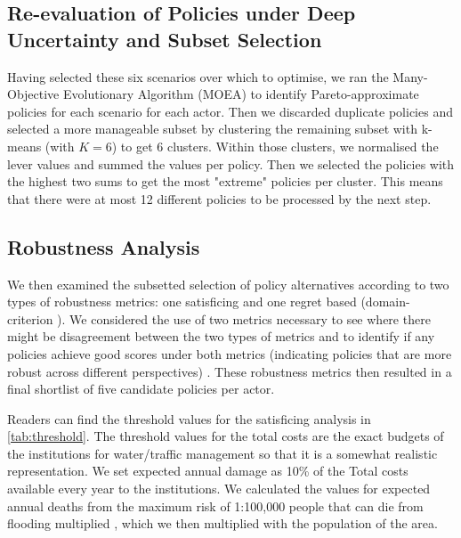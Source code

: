 \subsection{Re-evaluation of Policies under Deep Uncertainty and Subset Selection}
Having selected these six scenarios over which to optimise, we ran the Many-Objective Evolutionary Algorithm (MOEA) to identify Pareto-approximate policies for each scenario for each actor. Then we discarded duplicate policies and selected a more manageable subset by clustering the remaining subset with k-means (with $K=6$) to get 6 clusters. Within those clusters, we normalised the lever values and summed the values per policy. Then we selected the policies with the highest two sums to get the most "extreme" policies per cluster. This means that there were at most 12 different policies to be processed by the next step.

\subsection{Robustness Analysis}
We then examined the subsetted selection of policy alternatives according to two types of robustness metrics: one satisficing and one regret based (domain-criterion \parencite{bartholomew_considering_2020}). We considered the use of two metrics necessary to see where there might be disagreement between the two types of metrics and to identify if any policies achieve good scores under both metrics (indicating policies that are more robust across different perspectives) \parencite{mcphail_robustness_2018}. These robustness metrics then resulted in a final shortlist of five candidate policies per actor.

Readers can find the threshold values for the satisficing analysis in \autoref{tab:threshold}. The threshold values for the total costs are the exact budgets of the institutions for water/traffic management so that it is a somewhat realistic representation. We set expected annual damage as 10\% of the Total costs available every year to the institutions. We calculated the values for expected annual deaths from the maximum risk of 1:100,000 people that can die from flooding multiplied \parencite{slootjes_achtergronden_2016}, which we then multiplied with the population of the area.


